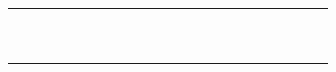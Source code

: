 \begin{landscape}
\begin{longtable}{llllllllllllllllllll}
    &    &    &       &     &     &     &     &      &      &      &      &      &       &      &      &      &      &      &       \\
    &    &    &       &     &     &     &     &      &      &      &      &      &       &      &      &      &      &      &       \\
    &    &    &       &     &     &     &     &      &      &      &      &      &       &      &      &      &      &      &       \\
    &    &    &       &     &     &     &     &      &      &      &      &      &       &      &      &      &      &      &       \\
    &    &    &       &     &     &     &     &      &      &      &      &      &       &      &      &      &      &      &       \\
    &    &    &       &     &     &     &     &      &      &      &      &      &       &      &      &      &      &      &       \\
    &    &    &       &     &     &     &     &      &      &      &      &      &       &      &      &      &      &      &       \\
    &    &    &       &     &     &     &     &      &      &      &      &      &       &      &      &      &      &      &       \\
    &    &    &       &     &     &     &     &      &      &      &      &      &       &      &      &      &      &      &      
\end{longtable}
\end{landscape}